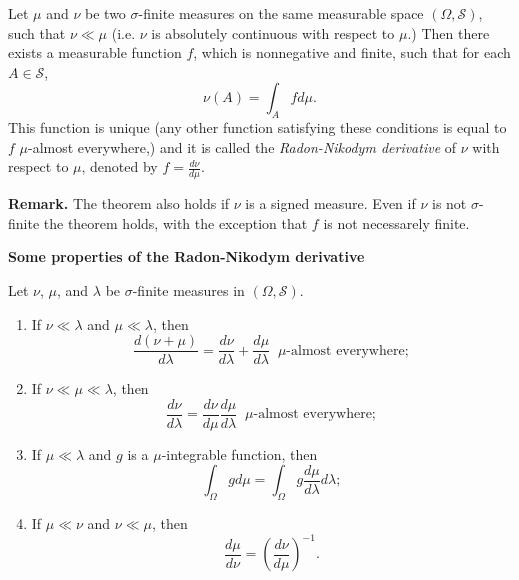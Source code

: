 \documentclass[12pt]{article}
\begin{document}
Let $\mu$ and $\nu$ be two $\sigma$-finite measures on the same measurable space $(\Omega, \mathscr{S})$, such that $\nu\ll \mu$ 
(i.e. $\nu$ is absolutely continuous with respect to $\mu$.) 
Then there exists a measurable function $f$, which is nonnegative 
and finite, such that for each $A\in \mathscr{S}$, 
\[\nu(A)=\int_A fd\mu.\]
This function is unique (any other function satisfying these
conditions is equal to $f$ $\mu$-almost everywhere,) and it is called
the \emph{Radon-Nikodym derivative} of $\nu$ with respect to $\mu$, 
denoted by $f = \frac{d\nu}{d\mu}$.

\textbf{Remark.} The theorem also holds if $\nu$ is a signed measure. Even if $\nu$ is not $\sigma$-finite the theorem holds, with the exception that $f$ is not necessarely finite.

\textbf{Some properties of the Radon-Nikodym derivative}

Let $\nu$, $\mu$, and $\lambda$ be $\sigma$-finite measures in 
$(\Omega,\mathscr{S})$. 

\begin{enumerate}
\item If $\nu \ll \lambda$ and $\mu\ll\lambda$, then
\[\frac{d(\nu+\mu)}{d\lambda} = 
\frac{d\nu}{d\lambda}+\frac{d\mu}{d\lambda}\;\; 
\mu\mbox{-almost everywhere};\]

\item If $\nu\ll\mu\ll\lambda$, then
\[\frac{d\nu}{d\lambda}=\frac{d\nu}{d\mu}\frac{d\mu}{d\lambda}
\;\; \mu\mbox{-almost everywhere};\]

\item If $\mu\ll\lambda$ and $g$ is a $\mu$-integrable function, then 
\[\int_\Omega gd\mu = \int_\Omega g\frac{d\mu}{d\lambda}d\lambda;\]

\item If $\mu\ll\nu$ and $\nu \ll\mu$, then 
\[\frac{d\mu}{d\nu}=\left(\frac{d\nu}{d\mu}\right)^{-1}.\]

\end{enumerate}
\end{document}
